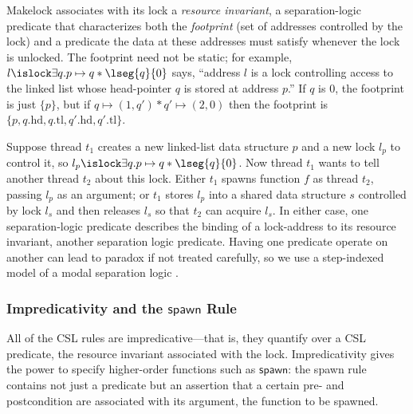 \textsf{Makelock}
associates with its lock a \emph{resource invariant},
a separation-logic predicate that characterizes both the \emph{footprint}
(set of addresses controlled by the lock) and a predicate the
data at these addresses must satisfy whenever the lock is unlocked.
The footprint need not be static; for example,
$ l \islock \exists q. p\mapsto q * \lseg{q}{0} $ says, ``address $l$ is a lock
controlling access to the linked list whose head-pointer $q$ is stored at address $p$.''
If $q$ is 0, the footprint is just $\{p\}$,
but if $q\mapsto (1,q') * q' \mapsto (2,0)$ then
the footprint is $\{p,q.\mathrm{hd},q.\mathrm{tl},q'.\mathrm{hd},q'.\mathrm{tl}\}$.

Suppose thread $t_1$ creates a new linked-list
data structure $p$ and a new lock $l_p$
to control it, so $l_p \islock \exists q. p\mapsto q * \lseg{q}{0}$.
Now thread $t_1$ wants to tell another thread $t_2$ about this
lock. Either $t_1$ spawns function $f$ as thread $t_2$, passing $l_p$ as an argument;
or $t_1$ stores $l_p$ into a shared data structure $s$
controlled by lock $l_s$ and then releases $l_s$ so that $t_2$
can acquire $l_s$.  In either case, one separation-logic predicate
describes
the binding of a lock-address to its resource invariant, another
separation logic predicate.  Having one predicate operate on another
can lead to paradox if not treated carefully,
so we use a step-indexed model of a modal
separation logic \cite{hobor10:popl}.


\subsubsection{Impredicativity and the $\mathsf{spawn}$ Rule}
All of the CSL rules are impredicative---that is, they quantify over a CSL predicate, the resource invariant associated with the lock.
Impredicativity gives the power to specify higher-order functions such as 
$\mathsf{spawn}$: the \textsf{spawn} rule contains not just a predicate but an assertion that a certain pre- and postcondition are associated with its argument, the function to be spawned.

